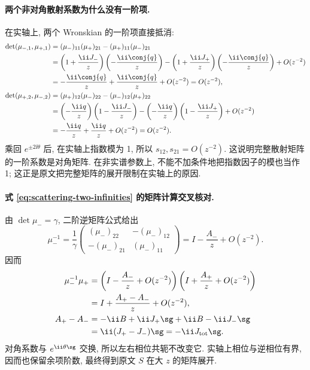 \paragraph{两个非对角散射系数为什么没有一阶项.}
在实轴上, 两个 Wronskian 的一阶项直接抵消:
\begin{align*}
\det(\mu_{-,1},\mu_{+,1})
&=(\mu_-)_{11}(\mu_+)_{21}-(\mu_+)_{11}(\mu_-)_{21}\\
&=\left(1+\dfrac{\ii J_-}{z}\right)
\left(-\dfrac{\ii\conj{q}}{z}\right)
-\left(1+\dfrac{\ii J_+}{z}\right)
\left(-\dfrac{\ii\conj{q}}{z}\right)+O(z^{-2})\\
&=-\dfrac{\ii\conj{q}}{z}+\dfrac{\ii\conj{q}}{z}+O(z^{-2})
=O(z^{-2}),\\
\det(\mu_{+,2},\mu_{-,2})
&=(\mu_+)_{12}(\mu_-)_{22}-(\mu_-)_{12}(\mu_+)_{22}\\
&=\left(-\dfrac{\ii q}{z}\right)
\left(1-\dfrac{\ii J_-}{z}\right)
-\left(-\dfrac{\ii q}{z}\right)
\left(1-\dfrac{\ii J_+}{z}\right)+O(z^{-2})\\
&=-\dfrac{\ii q}{z}+\dfrac{\ii q}{z}+O(z^{-2})=O(z^{-2}).
\end{align*}
乘回 $e^{\pm2\ii\theta}$ 后, 在实轴上指数模为 1,
所以 $s_{12},s_{21}=O(z^{-2})$.
这说明完整散射矩阵的一阶系数是对角矩阵.
在非实谱参数上, 不能不加条件地把指数因子的模也当作 1;
这正是原文把完整矩阵的展开限制在实轴上的原因.

\paragraph{式 \eqref{eq:scattering-two-infinities} 的矩阵计算交叉核对.}
由 $\det\mu_-=\gamma$, 二阶逆矩阵公式给出
\[
\mu_-^{-1}
=\dfrac{1}{\gamma}
\begin{pmatrix}(\mu_-)_{22}&-(\mu_-)_{12}\\
-(\mu_-)_{21}&(\mu_-)_{11}\end{pmatrix}
=I-\dfrac{A_-}{z}+O(z^{-2}).
\]
因而
\begin{align*}
\mu_-^{-1}\mu_+
&=\left(I-\dfrac{A_-}{z}+O(z^{-2})\right)
\left(I+\dfrac{A_+}{z}+O(z^{-2})\right)\\
&=I+\dfrac{A_+-A_-}{z}+O(z^{-2}),\\
A_+-A_-
&=-\ii B+\ii J_+\sg+\ii B-\ii J_-\sg\\
&=\ii(J_+-J_-)\sg=-\ii J_{\rm tot}\sg.
\end{align*}
对角系数与 $e^{\ii\theta\sg}$ 交换,
所以左右相位共轭不改变它.
实轴上相位与逆相位有界, 因而也保留余项阶数,
最终得到原文 $S$ 在大 $z$ 的矩阵展开.

